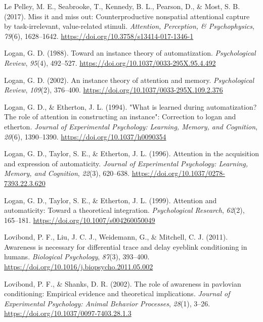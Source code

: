 \documentclass[
  man,
  floatsintext,
  longtable,
  nolmodern,
  notxfonts,
  notimes,
  colorlinks=true,linkcolor=blue,citecolor=blue,urlcolor=blue]{apa7}
\newlength{\cslhangindent}
\newenvironment{CSLReferences}[2] %
 {\begin{list}{}{%
  \setlength{\itemindent}{0pt}
  \setlength{\leftmargin}{0pt}
  \setlength{\parsep}{0pt}
  \ifodd #1
   \setlength{\leftmargin}{\cslhangindent}
   \setlength{\itemindent}{-1\cslhangindent}
  \fi
  \setlength{\itemsep}{#2\baselineskip}}}
 {\end{list}}
\begin{document}
\begin{CSLReferences}{1}{0}
Le Pelley, M. E., Seabrooke, T., Kennedy, B. L., Pearson, D., \& Most,
S. B. (2017). Miss it and miss out: Counterproductive nonspatial
attentional capture by task-irrelevant, value-related stimuli.
\emph{Attention, Perception, \& Psychophysics}, \emph{79}(6),
1628--1642. \url{https://doi.org/10.3758/s13414-017-1346-1}

Logan, G. D. (1988). Toward an instance theory of automatization.
\emph{Psychological Review}, \emph{95}(4), 492--527.
\url{https://doi.org/10.1037/0033-295X.95.4.492}

Logan, G. D. (2002). An instance theory of attention and memory.
\emph{Psychological Review}, \emph{109}(2), 376--400.
\url{https://doi.org/10.1037/0033-295X.109.2.376}

Logan, G. D., \& Etherton, J. L. (1994). {"}What is learned during
automatization? The role of attention in constructing an instance{"}:
Correction to logan and etherton. \emph{Journal of Experimental
Psychology: Learning, Memory, and Cognition}, \emph{20}(6), 1390--1390.
\url{https://doi.org/10.1037/h0090354}

Logan, G. D., Taylor, S. E., \& Etherton, J. L. (1996). Attention in the
acquisition and expression of automaticity. \emph{Journal of
Experimental Psychology: Learning, Memory, and Cognition}, \emph{22}(3),
620--638. \url{https://doi.org/10.1037/0278-7393.22.3.620}

Logan, G. D., Taylor, S. E., \& Etherton, J. L. (1999). Attention and
automaticity: Toward a theoretical integration. \emph{Psychological
Research}, \emph{62}(2), 165--181.
\url{https://doi.org/10.1007/s004260050049}

Lovibond, P. F., Liu, J. C. J., Weidemann, G., \& Mitchell, C. J.
(2011). Awareness is necessary for differential trace and delay eyeblink
conditioning in humans. \emph{Biological Psychology}, \emph{87}(3),
393--400. \url{https://doi.org/10.1016/j.biopsycho.2011.05.002}

Lovibond, P. F., \& Shanks, D. R. (2002). The role of awareness in
pavlovian conditioning: Empirical evidence and theoretical implications.
\emph{Journal of Experimental Psychology: Animal Behavior Processes},
\emph{28}(1), 3--26. \url{https://doi.org/10.1037/0097-7403.28.1.3}


\end{CSLReferences}
\end{document}
